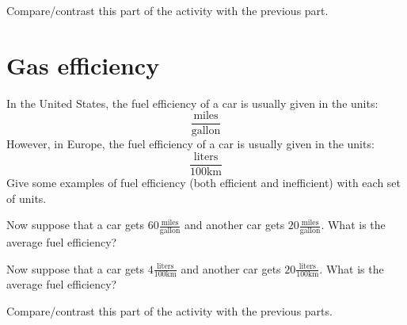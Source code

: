 \documentclass[handout,space,nooutcomes]{ximera}
\begin{document}
\break

\begin{question}
Compare/contrast this part of the activity with the previous part.
\begin{freeResponse}
\end{freeResponse}
\end{question}


\section*{Gas efficiency}

\begin{question}
In the United States, the fuel efficiency of a car is usually given in
the units:
\[
\frac{\text{miles}}{\text{gallon}}
\]
However, in Europe, the fuel efficiency of a car is usually given in
the units:
\[
\frac{\text{liters}}{100 \mathrm{km}}
\]
Give some examples of fuel efficiency (both efficient and
inefficient) with each set of units.
\begin{freeResponse}
\end{freeResponse}
\end{question}

\break

\begin{question}
Now suppose that a car gets $60\frac{\text{miles}}{\text{gallon}}$ and
another car gets $20\frac{\text{miles}}{\text{gallon}}$. What is the
average fuel efficiency?
\begin{freeResponse}
\end{freeResponse}
\end{question}


\begin{question}
Now suppose that a car gets $4\frac{\text{liters}}{100 \mathrm{km}} $
and another car gets $20\frac{\text{liters}}{100 \mathrm{km}}$. What
is the average fuel efficiency?
\begin{freeResponse}
\end{freeResponse}
\end{question}

\begin{question}
Compare/contrast this part of the activity with the previous parts.
\begin{freeResponse}
\end{freeResponse}
\end{question}
\end{document}
